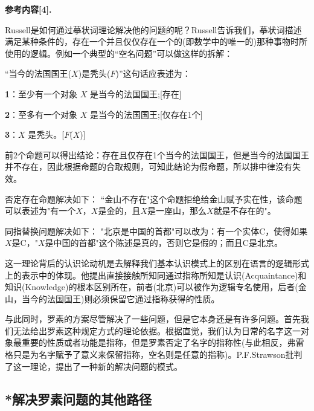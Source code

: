 \documentclass{article}
\begin{document}
\textbf{\kaishu 参考内容[4].} \ {\kaishu Russell是如何通过摹状词理论解决他的问题的呢？Russell告诉我们，摹状词描述满足某种条件的，存在一个并且仅仅存在一个的(即数学中的唯一的)那种事物时所使用的逻辑。例如一个典型的“空名问题”可以做这样的拆解：

“当今的法国国王($X$)是秃头($F$)”这句话应表述为：

\textbf{1}：至少有一个对象 $X$ 是当今的法国国王;[存在]

\textbf{2}：至多有一个对象 $X$ 是当今的法国国王;[仅存在1个]

\textbf{3}：$X$ 是秃头。[$F$($X$)]

前2个命题可以得出结论：存在且仅存在1个当今的法国国王，但是当今的法国国王并不存在，因此根据命题的合取规则，可知此结论为假命题，所以排中律没有失效。

否定存在命题解决如下：
“金山不存在"这个命题拒绝给金山赋予实在性，该命题可以表述为"有一个$X$，$X$是金的，且$X$是一座山，那么$X$就是不存在的"。

同指替换问题解决如下：
"北京是中国的首都"可以改为：有一个实体C，使得如果$X$是C，"$X$是中国的首都"这个陈述是真的，否则它是假的；而且C是北京。
}

这一理论背后的认识论动机是去解释我们基本认识模式上的区别在语言的逻辑形式上的表示中的体现。他提出直接接触所知同通过指称所知是认识(Acquaintance)和知识(Knowledge)的根本区别所在，前者(北京)可以被作为逻辑专名使用，后者(金山，当今的法国国王)则必须保留它通过指称获得的性质。

与此同时，罗素的方案尽管解决了一些问题，但是它本身还是有许多问题。首先我们无法给出罗素这种规定方式的理论依据。根据直觉，我们认为日常的名字这一对象最重要的性质或者功能是指称，但是罗素否定了名字的指称性(与此相反，弗雷格只是为名字赋予了意义来保留指称，空名则是任意的指称)。P.F.Strawson批判了这一理论，提出了一种新的解决问题的模式。

\subsection{\textbf{*}解决罗素问题的其他路径}
\end{document}

